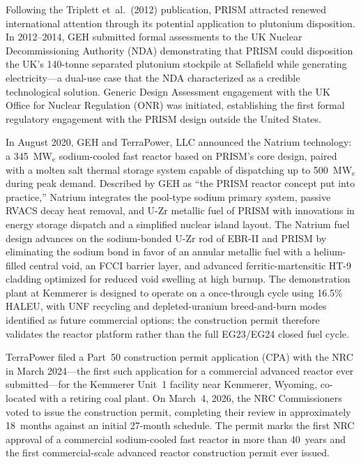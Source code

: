 \documentclass[10pt,twoside]{article}
\begin{document}
Following the Triplett et~al.\ (2012) publication, PRISM attracted
renewed international attention through its potential application to
plutonium disposition.  In 2012--2014, GEH submitted formal assessments
to the UK Nuclear Decommissioning Authority (NDA) demonstrating that
PRISM could disposition the UK's 140-tonne separated plutonium stockpile
at Sellafield while generating electricity---a dual-use case that the
NDA characterized as a credible technological solution.  Generic Design
Assessment engagement with the UK Office for Nuclear Regulation (ONR)
was initiated, establishing the first formal regulatory engagement with
the PRISM design outside the United States.

In August 2020, GEH and TerraPower, LLC announced the Natrium technology:
a 345~MW$_\text{e}$ sodium-cooled fast reactor based on PRISM's core
design, paired with a molten salt thermal storage system capable of
dispatching up to 500~MW$_\text{e}$ during peak demand.\cite{NatriumPermit2026}
Described by GEH as ``the PRISM reactor concept put into practice,'' Natrium
integrates the pool-type sodium primary system, passive RVACS decay heat
removal, and U-Zr metallic fuel of PRISM with innovations in energy
storage dispatch and a simplified nuclear island layout.\cite{Hejzlar2021}
The Natrium fuel design advances on the sodium-bonded U-Zr rod of
EBR-II and PRISM by eliminating the sodium bond in favor of an
annular metallic fuel with a helium-filled central void, an FCCI
barrier layer, and advanced ferritic-martensitic HT-9 cladding
optimized for reduced void swelling at high burnup.\cite{Hejzlar2021}
The demonstration plant at Kemmerer is designed to operate on a
once-through cycle using 16.5\% HALEU, with UNF recycling and
depleted-uranium breed-and-burn modes identified as future commercial
options; the construction permit therefore validates the reactor
platform rather than the full EG23/EG24 closed fuel cycle.

TerraPower filed a Part~50 construction permit application (CPA) with the
NRC in March 2024---the first such application for a commercial advanced
reactor ever submitted---for the Kemmerer Unit~1 facility near Kemmerer,
Wyoming, co-located with a retiring coal plant.  On March~4, 2026, the
NRC Commissioners voted to issue the construction permit, completing their
review in approximately 18~months against an initial 27-month
schedule.\cite{NatriumPermit2026}  The permit marks the first NRC approval
of a commercial sodium-cooled fast reactor in more than 40~years and the
first commercial-scale advanced reactor construction permit ever issued.
\end{document}
